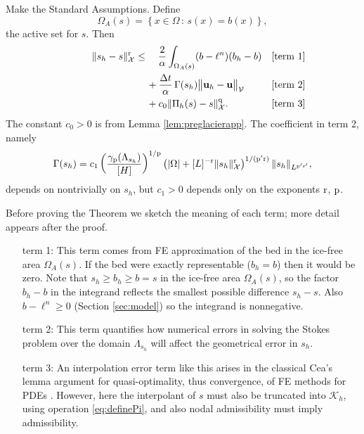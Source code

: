 \documentclass[hidelinks,onefignum,onetabnum,final]{siamart220329}  %
\newcommand{\bu}{\mathbf{u}}
\newcommand{\cK}{\mathcal{K}}
\newcommand{\cV}{\mathcal{V}}
\newcommand{\cX}{\mathcal{X}}
\newcommand{\pp}{{\text{\textnormal{p}}}}
\newcommand{\qq}{{\text{\textnormal{q}}}}
\newcommand{\rr}{{\text{\textnormal{r}}}}
\begin{document}
\begin{theorem} \label{thm:glacierapp}  Make the Standard Assumptions.  Define
\begin{equation}
\Omega_A(s) = \left\{x\in\Omega\,:\,s(x)=b(x)\right\},
\end{equation}
the active set for $s$.  Then
\begin{align}
\phantom{dfkljsd} \|s_h-s\|_\cX^\rr &\le \quad \frac{2}{\alpha} \int_{\Omega_A(s)} (b - \ell^n) (b_h - b) &&\text{\textnormal{[term 1]}} \label{eq:glacierestimate} \\
   &\quad\, + \frac{\Delta t}{\alpha} \, \Gamma(s_h) \big\|\bu_h - \bu\big\|_{\cV} &&\text{\textnormal{[term 2]}} \notag \\
   &\quad\, + c_0 \|\Pi_h(s) - s\|_\cX^\qq. &&\text{\textnormal{[term 3]}} \notag
\end{align}
The constant $c_0>0$ is from Lemma \ref{lem:preglacierapp}.  The coefficient in term 2, namely
\begin{equation}
\Gamma(s_h) = c_1 \left(\frac{\gamma_\pp(\Lambda_{s_h})}{[H]}\right)^{1/\pp} \left(|\Omega| + [L]^{-\rr}\|s_h\|_{\cX}^\rr\right)^{1/(\pp'\rr)} \|s_h\|_{L^{\pp'\rr'}},
\end{equation}
depends on nontrivially on $s_h$, but $c_1>0$ depends only on the exponents $\rr$, $\pp$.
\end{theorem}

Before proving the Theorem we sketch the meaning of each term; more detail appears after the proof.

\medskip
\begin{itemize}
\item[term 1:]  This term comes from FE approximation of the bed in the ice-free area $\Omega_A(s)$.  If the bed were exactly representable ($b_h=b$) then it would be zero.  Note that $s_h \ge b_h \ge b = s$ in the ice-free area $\Omega_A(s)$, so the factor $b_h-b$ in the integrand reflects the smallest possible difference $s_h - s$.  Also $b-\ell^n\ge 0$ (Section \ref{sec:model}) so the integrand is nonnegative.

\item[term 2:]  This term quantifies how numerical errors in solving the Stokes problem over the domain $\Lambda_{s_h}$ will affect the geometrical error in $s_h$.

\item[term 3:]  An interpolation error term like this arises in the classical Cea's lemma argument for quasi-optimality, thus convergence, of FE methods for PDEs \cite{Ciarlet2002}.  However, here the interpolant of $s$ must also be truncated into $\cK_h$, using operation \eqref{eq:definePi}, and also nodal admissibility must imply admissibility.
\end{itemize}
\end{document}
